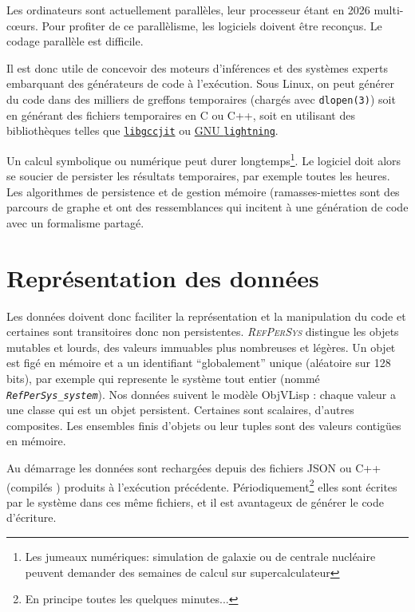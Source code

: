 \documentclass[french]{pfia}
\newcommand{\RefPerSys}{{\textit{\textsc{RefPerSys}}}}
\begin{document}
Les ordinateurs sont actuellement parallèles, leur processeur étant en
2026 multi-c{\oe}urs. Pour profiter de ce parallèlisme, les logiciels
doivent être reconçus. Le codage parallèle est
difficile\cite{sangiorgi:2003:pi-calculus,
  foster:1995:designing-parallel, mitchell:2001:advanced-linux-prog,
  computing1995designing, stallings:2003:organisation}.

Il est donc utile de concevoir des moteurs d'inférences et des
systèmes experts embarquant des générateurs de code à
l'exécution. Sous Linux, on peut générer du code dans
des milliers de greffons temporaires (chargés avec \texttt{dlopen(3)})
soit en générant des fichiers temporaires en C ou C++, soit en
utilisant des bibliothèques telles que
\href{https://gcc.gnu.org/onlinedocs/jit}{\texttt{libgccjit}} ou
\href{https://www.gnu.org/software/lightning/}{GNU
  \texttt{lightning}}.

Un calcul symbolique ou numérique peut durer longtemps\footnote{Les
jumeaux numériques: simulation de galaxie ou de centrale nucléaire
peuvent demander des semaines de calcul sur supercalculateur}. Le
logiciel doit alors se soucier de persister
\cite{dearle:2009:orthogonal} les résultats temporaires, par exemple
toutes les heures. Les algorithmes de persistence et de gestion
mémoire (ramasses-miettes \cite{jones:2016:gchandbook} sont des
parcours de graphe et ont des ressemblances qui incitent à une
génération de code avec un formalisme partagé.

\section{Représentation des données}
Les données doivent donc faciliter la représentation et la
manipulation du code et certaines sont transitoires donc non
persistentes. \RefPerSys{} distingue les objets mutables et lourds,
des valeurs immuables plus nombreuses et légères. Un objet est figé en
mémoire et a un identifiant ``globalement'' unique (aléatoire sur 128
bits), par exemple {} qui
represente le système tout entier (nommé
\texttt{\textit{RefPerSys\_system}}). Nos données suivent le modèle
ObjVLisp \cite{cointe:1987:metaclasses}: chaque valeur a une classe
qui est un objet persistent. Certaines sont scalaires, d'autres
composites. Les ensembles finis d'objets ou leur tuples sont des
valeurs contigües en mémoire.

Au démarrage les données sont rechargées depuis des fichiers JSON ou
C++ (compilés \cite{mazur:2004:compile, stroustrup:2018:tourcplusplus, levine:1999:linkers-loaders,
  pierce:2002:types, rougier:2017:ReScience}) produits à l'exécution
précédente. Périodiquement\footnote{En principe toutes les quelques
minutes...} elles sont écrites par le système dans ces même fichiers,
et il est avantageux
\cite{hernandez-phillips:2019:debugging-bootstrap} de générer le code
d'écriture.
\end{document}
